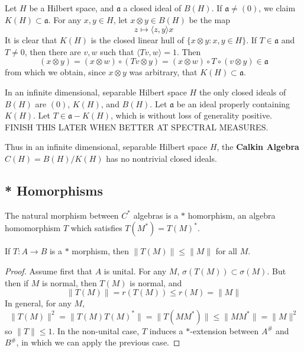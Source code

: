 \begin{example}
    Let $H$ be a Hilbert space, and $\mathfrak{a}$ a closed ideal of $B(H)$. If $\mathfrak{a} \neq (0)$, we claim $K(H) \subset \mathfrak{a}$. For any $x,y \in H$, let $x \otimes y \in B(H)$ be the map
    \[ z \mapsto \langle z, y \rangle x \]
    It is clear that $K(H)$ is the closed linear hull of $\{ x \otimes y: x,y \in H \}$. If $T \in \mathfrak{a}$ and $T \neq 0$, then there are $v,w$ such that $\langle Tv, w \rangle = 1$. Then
    \[ (x \otimes y) = (x \otimes w) \circ (Tv \otimes y) = (x \otimes w) \circ T \circ (v \otimes y) \in \mathfrak{a} \]
    from which we obtain, since $x \otimes y$ was arbitrary, that $K(H) \subset \mathfrak{a}$.
\end{example}

\begin{example}
    In an infinite dimensional, separable Hilbert space $H$ the only closed ideals of $B(H)$ are $(0)$, $K(H)$, and $B(H)$. Let $\mathfrak{a}$ be an ideal properly containing $K(H)$. Let $T \in \mathfrak{a} - K(H)$, which is without loss of generality positive. FINISH THIS LATER WHEN BETTER AT SPECTRAL MEASURES.

    Thus in an infinite dimensional, separable Hilbert space $H$, the {\bf Calkin Algebra} $C(H) = B(H)/K(H)$ has no nontrivial closed ideals.
\end{example}

\subsection{* Homorphisms}

The natural morphism between $C^*$ algebras is a $*$ homorphism, an algebra homomorphism $T$ which satisfies $T(M^*) = T(M)^*$.

\begin{prop}
    If $T: A \to B$ is a $*$ morphism, then $\| T(M) \| \leq \| M \|$ for all $M$.
\end{prop}
\begin{proof}
    Assume first that $A$ is unital. For any $M$, $\sigma(T(M)) \subset \sigma(M)$. But then if $M$ is normal, then $T(M)$ is normal, and
    \[ \| T(M) \| = r(T(M)) \leq r(M) = \| M \| \]
    In general, for any $M$,
    \[ \| T(M) \|^2 = \| T(M) T(M)^* \| = \| T(MM^*) \| \leq \| MM^* \| = \| M \|^2 \]
    so $\| T \| \leq 1$. In the non-unital case, $T$ induces a $*$-extension between $A^\#$ and $B^\#$, in which we can apply the previous case.
\end{proof}

